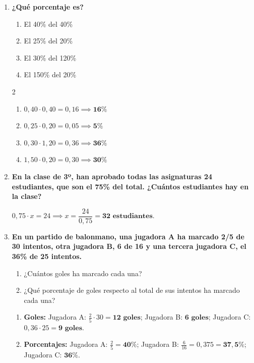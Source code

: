 \documentclass[a4paper,12pt]{article}
\begin{document}
\begin{enumerate}
    \item \textbf{¿Qué porcentaje es?}
        \begin{enumerate}[label=\alph*)]
            \item El 40\% del 40\%
            \item El 25\% del 20\%
            \item El 30\% del 120\%
            \item El 150\% del 20\%
        \end{enumerate}
        \begin{solucion}
            \begin{multicols}{2}
            \begin{enumerate}[label=\alph*)]
                \item $0,40 \cdot 0,40 = 0,16 \implies \mathbf{16\%}$
                \item $0,25 \cdot 0,20 = 0,05 \implies \mathbf{5\%}$
                \item $0,30 \cdot 1,20 = 0,36 \implies \mathbf{36\%}$
                \item $1,50 \cdot 0,20 = 0,30 \implies \mathbf{30\%}$
            \end{enumerate}
            \end{multicols}
        \end{solucion}

    \item \textbf{En la clase de 3º, han aprobado todas las asignaturas 24 estudiantes, que son el 75\% del total. ¿Cuántos estudiantes hay en la clase?}
        \begin{solucion}
            $0,75 \cdot x = 24 \implies x = \dfrac{24}{0,75} = \mathbf{32\text{ estudiantes}}$.
        \end{solucion}

    \item \textbf{En un partido de balonmano, una jugadora A ha marcado 2/5 de 30 intentos, otra jugadora B, 6 de 16 y una tercera jugadora C, el 36\% de 25 intentos.}
        \begin{enumerate}[label=\alph*)]
            \item ¿Cuántos goles ha marcado cada una?
            \item ¿Qué porcentaje de goles respecto al total de sus intentos ha marcado cada una?
        \end{enumerate}
        \begin{solucion}
            \begin{enumerate}[label=\alph*)]
                \item \textbf{Goles:} Jugadora A: $\frac{2}{5} \cdot 30 = \mathbf{12\text{ goles}}$; Jugadora B: $\mathbf{6\text{ goles}}$; Jugadora C: $0,36 \cdot 25 = \mathbf{9\text{ goles}}$.
                \item \textbf{Porcentajes:} Jugadora A: $\frac{2}{5} = \mathbf{40\%}$; Jugadora B: $\frac{6}{16} = 0,375 = \mathbf{37,5\%}$; Jugadora C: $\mathbf{36\%}$.
            \end{enumerate}
        \end{solucion}


\end{enumerate}
\end{document}
